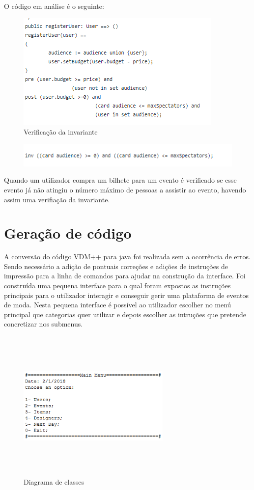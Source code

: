 \documentclass{article}
\begin{document}
O código em análise é o seguinte:
\begin{figure}[H]
\centering
\includegraphics{./images/invariantproof.png}
\caption{Verificação da invariante}
\label{fig:method}
\end{figure}

\begin{figure}[H]
\centering
\includegraphics{./images/invariant.png}
\end{figure}

Quando um utilizador compra um bilhete para um evento é verificado se esse evento já não atingiu o número máximo de pessoas a assistir ao evento,  havendo assim uma verifiação da invariante. 
\section{Geração de código}
A conversão do código VDM++ para java foi realizada sem a ocorrência de erros. Sendo necessário a adição de pontuais correções e adições de instruções de impressão para a linha de comandos para ajudar na construção da interface.
\newline
Foi construída uma pequena interface para o qual foram expostos as instruções principais para o utilizador interagir e conseguir gerir uma plataforma de eventos de moda. Nesta pequena interface é possível ao utilizador escolher no menú principal que categorias quer utilizar e depois escolher as intruções que pretende concretizar nos submenus.
\begin{figure}[H]
\centering
\includegraphics[width=75mm,height=75mm]{./images/interface.png}
\caption{Diagrama de classes}
\label{fig:method}
\end{figure}
\end{document}
